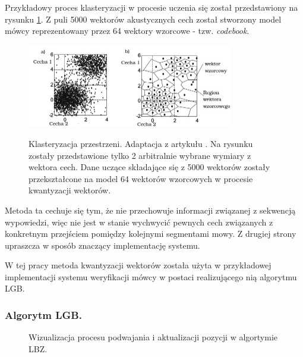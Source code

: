 Przykładowy proces klasteryzacji w procesie uczenia się został przedstawiony na rysunku \ref{VQjpg}. Z puli 5000 wektorów akustycznych cech został stworzony model mówcy reprezentowany przez 64 wektory wzorcowe - tzw. \textit{codebook}.

\begin{figure}[ht!]
  \centering
    \includegraphics[width=0.8\textwidth]{overwiewVQ.jpg}
    \label{VQjpg}
    \caption{Klasteryzacja przestrzeni. Adaptacja z artykułu \cite{overview}. Na rysunku zostały przedstawione tylko 2 arbitralnie wybrane wymiary z wektora cech. Dane uczące składające się z 5000 wektorów zostały przekształcone na model 64 wektorów wzorcowych w procesie kwantyzacji wektorów.}
\end{figure}

Metoda ta cechuje się tym, że nie przechowuje informacji związanej z sekwencją wypowiedzi, więc nie jest w stanie wychwycić pewnych cech związanych z konkretnym przejściem pomiędzy kolejnymi segmentami mowy. Z drugiej strony upraszcza w sposób znaczący implementację systemu.


W tej pracy metoda kwantyzacji wektorów została użyta w przykładowej implementacji systemu weryfikacji mówcy w postaci realizującego nią algorytmu LGB.

\subsubsection{Algorytm LGB.}
\label{lgb}

\begin{figure}
  \centering
    
    \caption{\label{lgbvis} Wizualizacja procesu podwajania i aktualizacji pozycji w algortymie LBZ.}
\end{figure}

